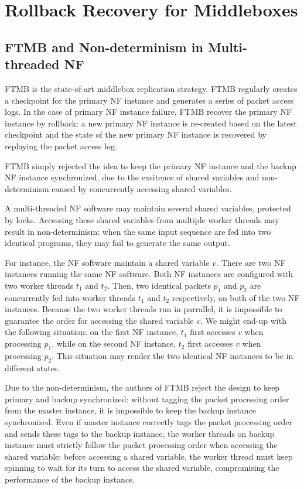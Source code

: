 \section{Rollback Recovery for Middleboxes}

\subsection{FTMB and Non-determinism in Multi-threaded NF}

FTMB \cite{sherry2015rollback} is the state-of-art middlebox replication
strategy. FTMB regularly creates a checkpoint for the primary NF instance and
generates a series of packet access logs. In the case of primary NF instance
failure, FTMB recover the primary NF instance by rollback: a new primary NF
instance is re-created based on the latest checkpoint and the state of the new
primary NF instance is recovered by replaying the packet access log. 


FTMB simply rejected the idea to keep the primary NF instance and the backup NF
instance synchronized, due to the exsitence of shared variables and
non-determinism caused by concurrently accessing shared variables.

A multi-threaded NF software may maintain several shared variables, protected by
locks. Accessing these shared variables from multiple worker threads may result in
non-determinism: when the same input sequence are fed into two identical
programs, they may fail to generate the same output.

For instance, the NF software maintain a shared variable $v$. There are two NF
instances running the same NF software. Both NF instances are configured with
two worker threads $t_1$ and $t_2$. Then, two identical packets $p_1$ and $p_2$
are concurrently fed into worker threads $t_1$ and $t_2$ respectively, on both
of the two NF instances. Because the two worker threads run in parrallel, it is
impossible to guarantee the order for accessing the shared variable $v$. We
might end-up with the following situation: on the first NF instance, $t_1$ first
accesses $v$ when processing $p_1$, while on the second NF instance, $t_2$ first
accesses $v$ when processing $p_2$. This situation may render the two identical
NF instances to be in different states.

Due to the non-determinism, the authors of FTMB \cite{sherry2015rollback} reject
the design to keep primary and backup synchronized: without tagging the packet
processing order from the master instance, it is impossible to keep the backup
instance synchronized. Even if master instance correctly tags the packet
processing order and sends these tags to the backup instance, the worker threads
on backup instance must strictly follow the packet processing order when
accessing the shared variable: before accessing a shared variable, the worker
thread must keep spinning to wait for its turn to access the shared variable,
compromising the performance of the backup instance.

